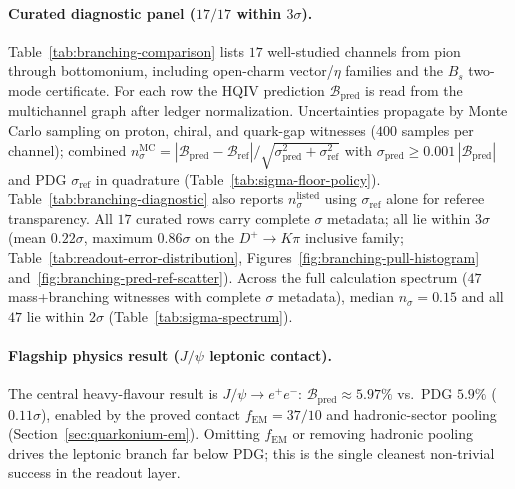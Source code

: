 \documentclass[11pt]{amsart}
\begin{document}
\paragraph{Curated diagnostic panel ($17/17$ within $3\sigma$).}
Table~\ref{tab:branching-comparison} lists $17$ well-studied channels from pion
through bottomonium, including open-charm vector/$\eta$ families and the
$B_s$ two-mode certificate.
For each row the HQIV prediction $\mathcal{B}_{\mathrm{pred}}$ is read from the
multichannel graph after ledger normalization.
Uncertainties propagate by Monte Carlo sampling on proton, chiral, and quark-gap
witnesses ($400$ samples per channel); combined
$n_\sigma^{\mathrm{MC}}=|\mathcal{B}_{\mathrm{pred}}-\mathcal{B}_{\mathrm{ref}}|/
\sqrt{\sigma_{\mathrm{pred}}^2+\sigma_{\mathrm{ref}}^2}$ with
$\sigma_{\mathrm{pred}}\ge 0.001\,|\mathcal{B}_{\mathrm{pred}}|$ and PDG
$\sigma_{\mathrm{ref}}$ in quadrature (Table~\ref{tab:sigma-floor-policy}).
Table~\ref{tab:branching-diagnostic} also reports $n_\sigma^{\mathrm{listed}}$
using $\sigma_{\mathrm{ref}}$ alone for referee transparency.
All $17$ curated rows carry complete $\sigma$ metadata; all lie within $3\sigma$
(mean $0.22\sigma$, maximum $0.86\sigma$ on the $D^+\to K\pi$ inclusive family;
Table~\ref{tab:readout-error-distribution}, Figures~\ref{fig:branching-pull-histogram}
and~\ref{fig:branching-pred-ref-scatter}).
Across the full calculation spectrum ($47$ mass+branching witnesses with complete
$\sigma$ metadata), median $n_\sigma=0.15$ and all $47$ lie within $2\sigma$
(Table~\ref{tab:sigma-spectrum}).

\paragraph{Flagship physics result ($J/\psi$ leptonic contact).}
The central heavy-flavour result is $J/\psi\to e^+e^-$:
$\mathcal{B}_{\mathrm{pred}}\approx 5.97\%$ vs.\ PDG $5.9\%$ ($0.11\sigma$),
enabled by the proved contact $f_{\mathrm{EM}}=37/10$ and hadronic-sector pooling
(Section~\ref{sec:quarkonium-em}).
Omitting $f_{\mathrm{EM}}$ or removing hadronic pooling drives the leptonic branch
far below PDG; this is the single cleanest non-trivial success in the readout layer.
\end{document}
